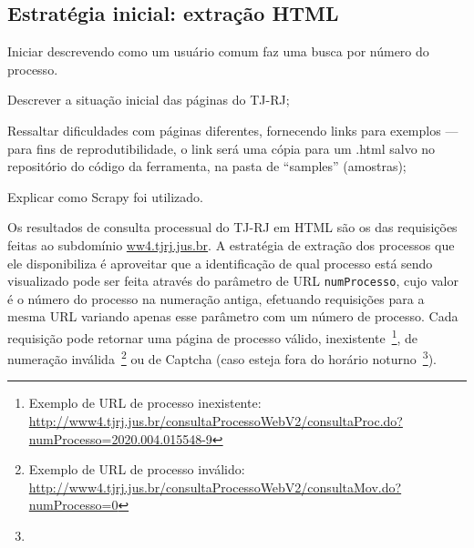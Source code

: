 \subsection{Estratégia inicial: extração HTML}

\begin{todolist}
    \item Iniciar descrevendo como um usuário comum faz uma busca por número do processo.
    \item Descrever a situação inicial das páginas do TJ-RJ;
    \item Ressaltar dificuldades com páginas diferentes, fornecendo links para
          exemplos --- para fins de reprodutibilidade, o link será uma cópia
          para um .html salvo no repositório do código da ferramenta, na pasta
          de ``samples'' (amostras);
    \item Explicar como Scrapy foi utilizado.
\end{todolist}


Os resultados de consulta processual do TJ-RJ em HTML são os das requisições
feitas ao subdomínio \url{ww4.tjrj.jus.br}. A estratégia de extração dos
processos que ele disponibiliza é aproveitar que a identificação de qual
processo está sendo visualizado pode ser feita através do parâmetro de URL
\texttt{numProcesso}, cujo valor é o número do processo na numeração antiga,
efetuando requisições para a mesma URL variando apenas esse parâmetro com um
número de processo. Cada requisição pode retornar uma página de processo
válido, inexistente~\footnote{Exemplo de URL de processo inexistente:
\url{http://www4.tjrj.jus.br/consultaProcessoWebV2/consultaProc.do?numProcesso=2020.004.015548-9}},
de numeração inválida~\footnote{Exemplo de URL de processo inválido:
\url{http://www4.tjrj.jus.br/consultaProcessoWebV2/consultaMov.do?numProcesso=0}}
ou de Captcha (caso esteja fora do horário noturno~\footnote{}).

\newcommand{\urlProcValido}{\url{%
    http://www4.tjrj.jus.br/consultaProcessoWebV2/consultaProc.do?numProcesso=2021.004.015548-9
}}

